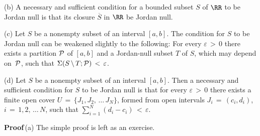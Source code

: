 \V

        (b) A necessary and sufficient condition for a bounded subset $S$ of ${\RR}$ to be Jordan null is that its closure $\overline{S}$ in ${\RR}$ be Jordan null.

\V

        (c) Let $S$ be a nonempty subset of an interval $[a,b]$. The condition for $S$ to be Jordan null can be weakened slightly to the following:
    For every ${\varepsilon}\,>\,0$ there exists a partition ${\cal P}$ of $[a,b]$ and a Jordan-null subset $T$ of $S$, which may depend on~${\cal P}$,
    such that ${\Sigma}(S\,{\setminus}\,T;{\cal P})\,<\,{\varepsilon}$.

\V

        (d) Let $S$ be a nonempty subset of an interval $[a,b]$. Then a necessary and sufficient condition for $S$ to be Jordan null is that
    for every ${\varepsilon}\,>\,0$ there exists a finite open cover $U \,=\, \{J_{1}, J_{2},\,{\ldots}\,J_{N}\}$,
    formed from open intervals $J_{i} \,=\, (c_{i},d_{i})$, $i \,=\, 1,2,\,{\ldots}\,N$, such that $\sum_{i=1}^{N} (d_{i}-c_{i})\,<\,{\varepsilon}$.


\V
        {\bf Proof}\,(a) The simple proof is left as an exercise. %

\V


